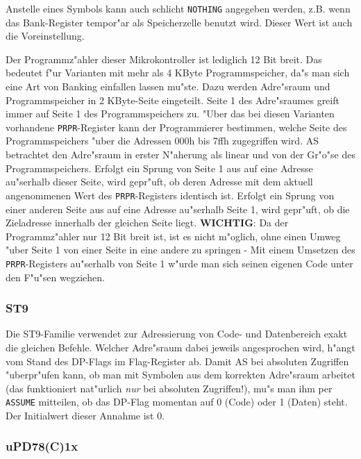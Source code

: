 \documentclass[12pt,a4paper,twoside]{report}
\newcommand{\tty}[1]{{\tt #1}}
\newcommand{\asname}{AS}
\begin{document}
Anstelle eines Symbols kann auch schlicht \tty{NOTHING} angegeben
werden, z.B. wenn das Bank-Register tempor"ar als Speicherzelle benutzt
wird.  Dieser Wert ist auch die Voreinstellung.

Der Programmz"ahler dieser Mikrokontroller ist lediglich 12 Bit breit.  Das
bedeutet f"ur Varianten mit mehr als 4 KByte Programmspeicher, da"s man sich
eine Art von Banking einfallen lassen mu"ste.  Dazu werden Adre"sraum und
Programmspeicher in 2 KByte-Seite eingeteilt.  Seite 1 des Adre"sraumes
greift immer auf Seite 1 des Programmspeichers zu.  "Uber das bei diesen
Varianten vorhandene \tty{PRPR}-Register kann der Programmierer bestimmen,
welche Seite des Programmspeichers "uber die Adressen 000h bis 7ffh
zugegriffen wird.  \asname{} betrachtet den Adre"sraum in erster N"aherung als
linear und von der Gr"o"se des Programmspeichers.  Erfolgt ein Sprung von
Seite 1 aus auf eine Adresse au"serhalb dieser Seite, wird gepr"uft, ob deren
Adresse mit dem aktuell angenommenen Wert des \tty{PRPR}-Registers identisch
ist.  Erfolgt ein Sprung von einer anderen Seite aus auf eine Adresse au"serhalb
Seite 1, wird gepr"uft, ob die Zieladresse innerhalb der gleichen Seite
liegt.  {\bf WICHTIG}: Da der Programmz"ahler nur 12 Bit breit ist, ist
es nicht m"oglich, ohne einen Umweg "uber Seite 1 von einer Seite in eine
andere zu springen - Mit einem Umsetzen des \tty{PRPR}-Registers au"serhalb
von Seite 1 w"urde man sich seinen eigenen Code unter den F"u"sen wegziehen.


\subsubsection{ST9}

Die ST9-Familie verwendet zur Adressierung von Code- und Datenbereich
exakt die gleichen Befehle.  Welcher Adre"sraum dabei jeweils
angesprochen wird, h"angt vom Stand des DP-Flags im Flag-Register ab.
Damit \asname{} bei absoluten Zugriffen "uberpr"ufen kann, ob man mit Symbolen
aus dem korrekten Adre"sraum arbeitet (das funktioniert nat"urlich {\em nur}
bei absoluten Zugriffen!), mu"s man ihm per \tty{ASSUME} mitteilen, ob das
DP-Flag momentan auf 0 (Code) oder 1 (Daten) steht.  Der Initialwert
dieser Annahme ist 0.


\subsubsection{uPD78(C)1x}
\end{document}
